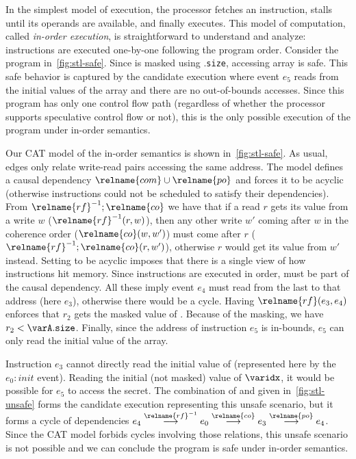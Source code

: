 \documentclass[conference]{IEEEtran}
\begin{document}
In the simplest model of execution, the processor fetches an instruction, stalls until its operands are available, and finally executes.
This model of computation, called \emph{in-order execution}, is straightforward to understand and analyze: instructions are executed one-by-one following the program order.
Consider the program in~\autoref{fig:stl-safe}. 
Since \varidx is masked using \varA.\texttt{size}, accessing array \varA is safe.
This safe behavior is captured by the candidate execution where event $e_5$ reads from the initial values of the array and there are no out-of-bounds accesses.
Since this program has only one control flow path (regardless of whether the processor supports speculative control flow or not), this is the only possible execution of the program under in-order semantics.

Our CAT model of the in-order semantics is shown in~\autoref{fig:stl-safe}.
As usual,  edges only relate write-read pairs accessing the same address.
The model defines a causal dependency $\relname{com} \cup \relname{po}$ and forces it to be acyclic (otherwise instructions could not be scheduled to satisfy their dependencies).
From $\relname{rf}^{-1};\relname{co}$ we have that if a read $r$ gets its value from a write $w$ ($\relname{rf}^{-1}(r,w)$), then any other write $w'$ coming after $w$ in the coherence order ($\relname{co}(w,w')$) must come after $r$ ($\relname{rf}^{-1};\relname{co}(r,w')$), otherwise $r$ would get its value from $w'$ instead.
Setting  to be acyclic imposes that there is a single view of how instructions hit memory.
Since instructions are executed in order,  must be part of the causal dependency.
All these imply event $e_4$ must read from the last \store to that address (here $e_3$), otherwise there would be a cycle.
Having $\relname{rf}(e_3,e_4)$ enforces that $r_2$ gets the masked value of \varidx.
Because of the masking, we have $r_2 < \varA.\texttt{size}$.
Finally, since the address of instruction $e_5$ is in-bounds, $e_5$ can only read the initial value of the array.

Instruction $e_3$ cannot directly read the initial value of \varidx (represented here by the $e_0: \mathit{init}$ event).
Reading the initial (not masked) value of $\varidx$, it would be possible for $e_5$ to access the secret.
The combination of  and  given in~\autoref{fig:stl-unsafe} forms the candidate execution representing this unsafe scenario, but it forms a cycle of dependencies $e_4 \stackrel{\relname{\scriptsize rf}^{-1}}{\longrightarrow} e_0 \stackrel{\relname{\scriptsize co}}{\longrightarrow} e_3 \stackrel{\relname{\scriptsize po}}{\longrightarrow} e_4$.
Since the CAT model forbids cycles involving those relations, this unsafe scenario is not possible and we can conclude the program is safe under in-order semantics.
\end{document}
